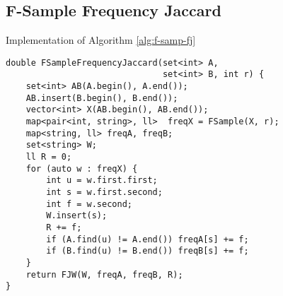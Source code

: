 \subsection*{F-Sample Frequency Jaccard}

Implementation of Algorithm \ref{alg:f-samp-fj}
\begin{lstlisting}
double FSampleFrequencyJaccard(set<int> A, 
                               set<int> B, int r) {
	set<int> AB(A.begin(), A.end());
	AB.insert(B.begin(), B.end());
	vector<int> X(AB.begin(), AB.end());
	map<pair<int, string>, ll>  freqX = FSample(X, r);
	map<string, ll> freqA, freqB;
	set<string> W;
	ll R = 0;
	for (auto w : freqX) {
		int u = w.first.first;
		int s = w.first.second;
		int f = w.second;
		W.insert(s);
		R += f;
		if (A.find(u) != A.end()) freqA[s] += f;
		if (B.find(u) != B.end()) freqB[s] += f;
	}
	return FJW(W, freqA, freqB, R);
}
\end{lstlisting}


\noindent

\clearpage